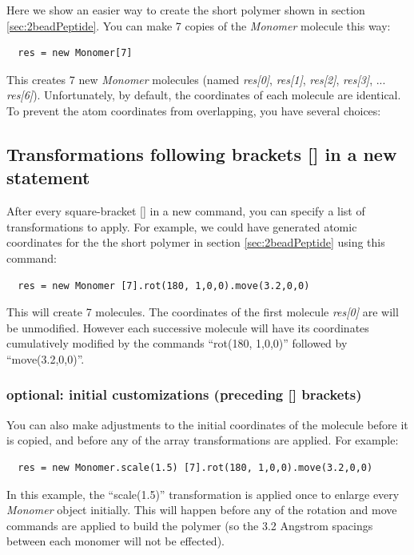 \documentclass[11pt]{article}
\begin{document}
Here we show an easier way to create the short polymer 
shown in section \ref{sec:2beadPeptide}.
You can make 7 copies of the \textit{Monomer} molecule this way:
\begin{verbatim}
  res = new Monomer[7]
\end{verbatim}
This creates 7 new \textit{Monomer} molecules (named 
\mbox{\textit{res[0]}}, 
\mbox{\textit{res[1]}}, 
\mbox{\textit{res[2]}}, 
\mbox{\textit{res[3]}}, ... 
\mbox{\textit{res[6]}}).
Unfortunately, by default, the coordinates of each molecule are identical.
To prevent the atom coordinates from overlapping, you have several choices:

\subsection{Transformations following brackets [] in a new statement}
\label{sec:arrays+xform}
   After every square-bracket [] in a new command,
you can specify a list of transformations to apply.
For example, we could have generated atomic coordinates for the 
the short polymer in section \ref{sec:2beadPeptide}
using this command:
\begin{verbatim}
  res = new Monomer [7].rot(180, 1,0,0).move(3.2,0,0)
\end{verbatim}
This will create 7 molecules.  
The coordinates of the first molecule \textit{res[0]} are will be unmodified.
However each successive molecule will have its coordinates cumulatively
modified by the commands ``rot(180, 1,0,0)'' followed by ``move(3.2,0,0)''.
\subsubsection*{optional: initial customizations (preceding [] brackets)}
\label{sec:xform+arrays+xform} 
You can also make adjustments to the initial coordinates of the molecule
before it is copied, and before any of the array transformations are applied.
For example:
\begin{verbatim}
  res = new Monomer.scale(1.5) [7].rot(180, 1,0,0).move(3.2,0,0)
\end{verbatim}
In this example, the ``scale(1.5)'' transformation is applied once to 
enlarge every \textit{Monomer} object initially.
This will happen before any of the rotation and move commands 
are applied to build the polymer
(so the 3.2 Angstrom spacings between each monomer will not be effected).
\end{document}

